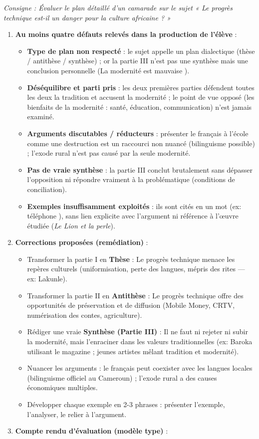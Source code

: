 \documentclass[11pt]{article}
\begin{document}
\begin{corrige}
\textit{Consigne : Évaluer le plan détaillé d'un camarade sur le sujet « Le progrès technique est-il un danger pour la culture africaine ? »}
\begin{enumerate}
\item \textbf{Au moins quatre défauts relevés dans la production de l'élève} :
\begin{itemize}
\item \textbf{Type de plan non respecté} : le sujet appelle un plan dialectique (thèse / antithèse / synthèse) ; or la partie III n'est pas une synthèse mais une conclusion personnelle (\og La modernité est mauvaise \fg).
\item \textbf{Déséquilibre et parti pris} : les deux premières parties défendent toutes les deux la tradition et accusent la modernité ; le point de vue opposé (les bienfaits de la modernité : santé, éducation, communication) n'est jamais examiné.
\item \textbf{Arguments discutables / réducteurs} : présenter le français à l'école comme une \og destruction \fg{} est un raccourci non nuancé (bilinguisme possible) ; l'exode rural n'est pas causé par la seule modernité.
\item \textbf{Pas de vraie synthèse} : la partie III conclut brutalement sans dépasser l'opposition ni répondre vraiment à la problématique (conditions de conciliation).
\item \textbf{Exemples insuffisamment exploités} : ils sont cités en un mot (ex: \og téléphone \fg), sans lien explicite avec l'argument ni référence à l'œuvre étudiée (\emph{Le Lion et la perle}).
\end{itemize}
\item \textbf{Corrections proposées (remédiation)} :
\begin{itemize}
\item Transformer la partie I en \textbf{Thèse} : \og Le progrès technique menace les repères culturels \fg (uniformisation, perte des langues, mépris des rites — ex: Lakunle).
\item Transformer la partie II en \textbf{Antithèse} : \og Le progrès technique offre des opportunités de préservation et de diffusion \fg (Mobile Money, CRTV, numérisation des contes, agriculture).
\item Rédiger une vraie \textbf{Synthèse (Partie III)} : \og Il ne faut ni rejeter ni subir la modernité, mais l'enraciner dans les valeurs traditionnelles \fg (ex: Baroka utilisant le magazine ; jeunes artistes mêlant tradition et modernité).
\item Nuancer les arguments : le français peut coexister avec les langues locales (bilinguisme officiel au Cameroun) ; l'exode rural a des causes économiques multiples.
\item Développer chaque exemple en 2-3 phrases : présenter l'exemple, l'analyser, le relier à l'argument.
\end{itemize}
\item \textbf{Compte rendu d'évaluation (modèle type)} :


\end{enumerate}
\end{corrige}
\end{document}
